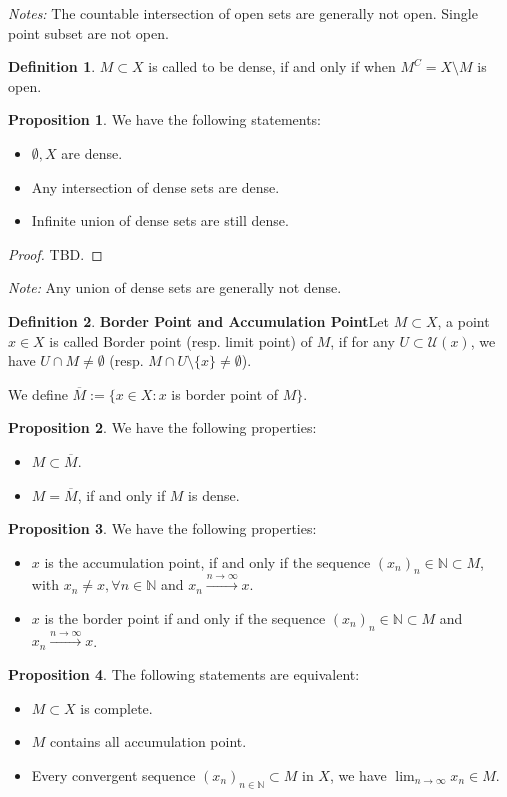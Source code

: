 \documentclass{article}
\theoremstyle{definition}
\newtheorem{defi}{Definition}[subsection]
\newtheorem{prop}{Proposition}[subsection]
\begin{document}
\textit{Notes:} The countable intersection of open sets are generally not open. Single point subset are not open.
\begin{defi}
$M\subset X$ is called to be dense, if and only if when $M^C = X \texttt{\textbackslash} M$ is open.
\end{defi}
\begin{prop}
We have the following statements:
\begin{itemize}
    \item $\emptyset, X$ are dense.
    \item Any intersection of dense sets are dense.
    \item Infinite union of dense sets are still dense.
\end{itemize}
\begin{proof}
TBD.
\end{proof}
\end{prop}
\textit{Note:} Any union of dense sets are generally not dense.
\begin{defi}
\textbf{Border Point and Accumulation Point}Let $M\subset X$, a point $x \in X$ is called Border point (resp. limit point) of $M$, if for any $U\subset \mathcal{U}(x)$, we have $U \cap M \neq \emptyset$ (resp. $M \cap U \texttt{\textbackslash} \{x\}\neq \emptyset$).

We define $\overline{M} := \{x\in X: x $ is border point of $M\}$.
\end{defi}
\begin{prop}
We have the following properties:
\begin{itemize}
    \item $M \subset \overline{M}$.
    \item $M=\overline{M}$, if and only if $M$ is dense.
\end{itemize}
\end{prop}
\begin{prop}
We have the following properties:
\begin{itemize}
    \item $x$ is the accumulation point, if and only if the sequence $(x_n)_n\in\mathbb{N}\subset M$, with $x_n\neq x, \forall n\in\mathbb{N}$ and $x_n\xrightarrow{n\to\infty}x$.
    \item $x$ is the border point if and only if the sequence $(x_n)_n\in\mathbb{N}\subset M$ and $x_n\xrightarrow{n\to\infty}x$.
\end{itemize}
\end{prop}
\begin{prop}
The following statements are equivalent:
\begin{itemize}
    \item $M \subset X$ is complete.
    \item $M$ contains all accumulation point.
    \item Every convergent sequence $(x_n)_{n\in\mathbb{N}}\subset M$ in $X$, we have $\lim_{n\to\infty}x_n\in M$.
\end{itemize}
\end{prop}
\end{document}
